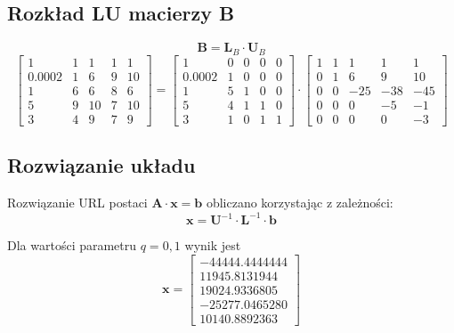 \documentclass[a4paper]{article}
\begin{document}
\subsection{Rozkład LU macierzy B}
$$ \textbf{B} = \textbf{L}_B \cdot \textbf{U}_B$$
$$
\left[
\begin{array}{ccccc}
1&1&1&1&1\\ 
0.0002&1&6&9&10\\ 
1&6&6&8&6\\ 
5&9&10&7&10\\ 
3&4&9&7&9
\end{array}
\right]
=
\left[
\begin{array}{ccccc}
1&0&0&0&0\\ 
0.0002&1&0&0&0\\ 
1&5&1&0&0\\ 
5&4&1&1&0\\ 
3&1&0&1&1
\end{array}
\right]
\cdot
\left[
\begin{array}{ccccc}
1&1&1&1&1\\ 
0&1&6&9&10\\ 
0&0&-25&-38&-45\\ 
0&0&0&-5&-1\\ 
0&0&0&0&-3
\end{array}
\right]
$$
\newpage
\subsection{Rozwiązanie układu}
Rozwiązanie URL postaci $\textbf{A} \cdot \textbf{x} = \textbf{b}$ obliczano korzystając z zależności: 
$$
\textbf{x} = \textbf{U}^{-1} \cdot \textbf{L}^{-1} \cdot \textbf{b}
$$

Dla wartości parametru $q = 0,1$ wynik jest
$$
\textbf{x} =
\left[
\begin{array}{c}
-44444.4444444\\ 
11945.8131944\\ 
19024.9336805\\ 
-25277.0465280\\ 
10140.8892363
\end{array}
\right]
$$
\end{document}
